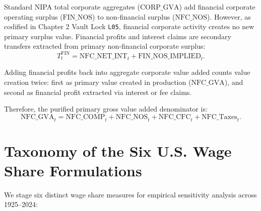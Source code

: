 \documentclass[11pt,a4paper]{article}
\begin{document}
Standard NIPA total corporate aggregates ($\text{CORP\_GVA}$) add financial corporate operating surplus ($\text{FIN\_NOS}$) to non-financial surplus ($\text{NFC\_NOS}$). However, as codified in Chapter 2 Vault Lock \texttt{L05}, financial corporate activity creates no new primary surplus value. Financial profits and interest claims are secondary transfers extracted from primary non-financial corporate surplus:
\begin{equation}
T_t^{\text{FIN}} = \text{NFC\_NET\_INT}_t + \text{FIN\_NOS\_IMPLIED}_t.
\end{equation}

Adding financial profits back into aggregate corporate value added counts value creation twice: first as primary value created in production ($\text{NFC\_GVA}$), and second as financial profit extracted via interest or fee claims.

Therefore, the purified primary gross value added denominator is:
\begin{equation}
\text{NFC\_GVA}_t = \text{NFC\_COMP}_t + \text{NFC\_NOS}_t + \text{NFC\_CFC}_t + \text{NFC\_Taxes}_t.
\end{equation}

\FloatBarrier
\section{Taxonomy of the Six U.S. Wage Share Formulations}

We stage six distinct wage share measures for empirical sensitivity analysis across 1925--2024:
\end{document}

